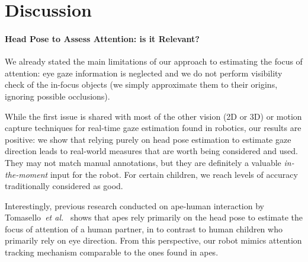 \documentclass{sig-alternate}
\newcommand{\etal}{\textit{et al.}\xspace}
\begin{document}



\section{Discussion}

\paragraph{Head Pose to Assess Attention: is it Relevant?}

%

We already stated the main limitations of our approach to estimating the focus
of attention: eye gaze information is neglected and we do not perform visibility
check of the in-focus objects (we simply approximate them to their origins,
ignoring possible occlusions).

While the first issue is shared with most of the other vision (2D or 3D) or
motion capture techniques for real-time gaze estimation found in robotics, our
results are positive: we show that relying purely on head pose estimation to
estimate gaze direction leads to real-world measures that are worth being
considered and used. They may not match manual annotations, but they are
definitely a valuable \emph{in-the-moment} input for the robot. For certain
children, we reach levels of accuracy traditionally considered as good.

Interestingly, previous research conducted on ape-human interaction by
Tomasello~\etal~\cite{tomasello2007reliance} shows that apes rely primarily on
the head pose to estimate the focus of attention of a human partner, in to
contrast to human children who primarily rely on eye direction. From this
perspective, our robot mimics attention tracking mechanism comparable to the
ones found in apes.
\end{document}
